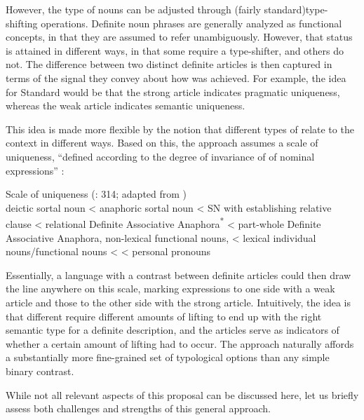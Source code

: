 \documentclass[output=paper
,modfonts
,nonflat]{langscibook}
\begin{document}
However, the type of nouns can be adjusted through (fairly standard)\largerpage[2]
type-shifting operations. Definite noun phrases are generally analyzed as functional
concepts, in that they are assumed to refer unambiguously. However,
that status is attained in different ways, in that some  require
a type-shifter, and others do not. The difference between two distinct
definite articles is then captured in terms of the signal they convey
about how  was achieved. For example, the idea for Standard
 would be that the strong article indicates pragmatic
uniqueness, whereas the weak article indicates semantic uniqueness.

This idea is made more flexible by the notion that different types of
 relate to the context in different ways. Based on
this, the approach assumes a scale of uniqueness, ``defined according to the degree of invariance
of  of nominal expressions'' \citep{Ortmann2014}:

\begin{exe} 
\ex Scale of uniqueness (\citealt{Ortmann2014}: 314; adapted from \citealt{Loebner2011})\\
      deictic sortal noun < anaphoric sortal noun < SN with
      establishing relative clause < relational Definite Associative
      Anaphora\textsuperscript{*} < part-whole
      Definite Associative
      Anaphora, non-lexical functional nouns, < lexical individual
      nouns/functional nouns <  < personal pronouns
\end{exe}

Essentially, a language with a contrast between definite articles
could then draw the line anywhere on this scale, marking expressions
to one side with a weak article and those to the other side with the
strong article. Intuitively, the
idea is that different  require different amounts of lifting to
end up with the right semantic type for a definite description, and
the articles serve as indicators of whether a certain amount of lifting
had to occur. The approach naturally affords a substantially more fine-grained set of
typological options than any simple binary contrast.\largerpage[2] 

While not all relevant aspects of this proposal can be discussed here, let
us briefly assess both challenges and strengths of this general
approach. 
\end{document}
